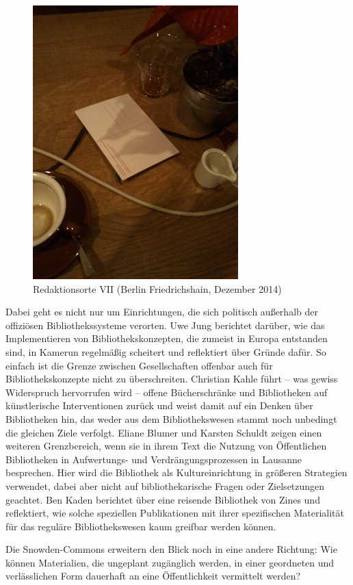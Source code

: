 \documentclass[a4paper,
fontsize=11pt,
oneside,
numbers=noperiodatend,
parskip=half-,
bibliography=totoc,
final
]{scrartcl}
\begin{document}
\begin{figure}[htbp]
\centering
\includegraphics{bild.jpg}
\caption{Redaktionsorte VII (Berlin Friedrichshain, Dezember 2014)}
\end{figure}

Dabei geht es nicht nur um Einrichtungen, die sich politisch außerhalb
der offiziösen Bibliothekssysteme verorten. Uwe Jung berichtet darüber,
wie das Implementieren von Bibliothekskonzepten, die zumeist in Europa
entstanden sind, in Kamerun regelmäßig scheitert und reflektiert über
Gründe dafür. So einfach ist die Grenze zwischen Gesellschaften offenbar
auch für Bibliothekskonzepte nicht zu überschreiten. Christian Kahle
führt -- was gewiss Widerspruch hervorrufen wird -- offene
Bücherschränke und Bibliotheken auf künstlerische Interventionen zurück
und weist damit auf ein Denken über Bibliotheken hin, das weder aus dem
Bibliothekswesen stammt noch unbedingt die gleichen Ziele verfolgt.
Eliane Blumer und Karsten Schuldt zeigen einen weiteren Grenzbereich,
wenn sie in ihrem Text die Nutzung von Öffentlichen Bibliotheken in
Aufwertungs- und Verdrängungsprozessen in Lausanne besprechen. Hier wird
die Bibliothek als Kultureinrichtung in größeren Strategien verwendet,
dabei aber nicht auf bibliothekarische Fragen oder Zielsetzungen
geachtet. Ben Kaden berichtet über eine reisende Bibliothek von Zines
und reflektiert, wie solche speziellen Publikationen mit ihrer
spezifischen Materialität für das reguläre Bibliothekswesen kaum
greifbar werden können.

Die Snowden-Commons erweitern den Blick noch in eine andere Richtung:
Wie können Materialien, die ungeplant zugänglich werden, in einer
geordneten und verlässlichen Form dauerhaft an eine Öffentlichkeit
vermittelt werden?
\end{document}

